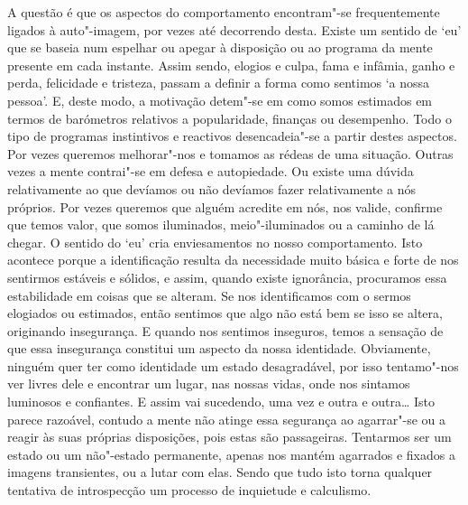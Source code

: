 A questão é que os aspectos do comportamento encontram"-se frequentemente
ligados à auto"-imagem, por vezes até decorrendo desta. Existe um sentido de
`eu' que se baseia num espelhar ou apegar à disposição ou ao programa da mente
presente em cada instante. Assim sendo, elogios e culpa, fama e infâmia, ganho e
perda, felicidade e tristeza, passam a definir a forma como sentimos `a nossa
pessoa'. E, deste modo, a motivação detem"-se em como somos estimados em termos
de barómetros relativos a popularidade, finanças ou desempenho. Todo o tipo de
programas instintivos e reactivos desencadeia"-se a partir destes aspectos. Por
vezes queremos melhorar"-nos e tomamos as rédeas de uma situação. Outras vezes a
mente contrai"-se em defesa e autopiedade. Ou existe uma dúvida relativamente ao
que devíamos ou não devíamos fazer relativamente a nós próprios. Por vezes
queremos que alguém acredite em nós, nos valide, confirme que temos valor, que
somos iluminados, meio"-iluminados ou a caminho de lá chegar. O sentido do `eu'
cria enviesamentos no nosso comportamento. Isto acontece porque a identificação
resulta da necessidade muito básica e forte de nos sentirmos estáveis e sólidos,
e assim, quando existe ignorância, procuramos essa estabilidade em coisas que se
alteram. Se nos identificamos com o sermos elogiados ou estimados, então
sentimos que algo não está bem se isso se altera, originando insegurança. E
quando nos sentimos inseguros, temos a sensação de que essa insegurança
constitui um aspecto da nossa identidade. Obviamente, ninguém quer ter como
identidade um estado desagradável, por isso tentamo"-nos ver livres dele e
encontrar um lugar, nas nossas vidas, onde nos sintamos luminosos e confiantes.
E assim vai sucedendo, uma vez e outra e outra\ldots{} Isto parece razoável,
contudo a mente não atinge essa segurança ao agarrar"-se ou a reagir às suas
próprias disposições, pois estas são passageiras. Tentarmos ser um estado ou um
não"-estado permanente, apenas nos mantém agarrados e fixados a imagens
transientes, ou a lutar com elas. Sendo que tudo isto torna qualquer tentativa
de introspecção um processo de inquietude e calculismo.

